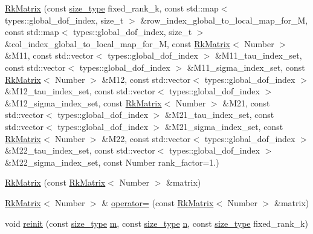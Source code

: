 \begin{DoxyCompactItemize}
\item 
\hyperlink{classRkMatrix_a00a2465dfb9445dca842f19fc757d008}{Rk\+Matrix} (const \hyperlink{classRkMatrix_add060bfc3a4cc77f858c3d6dd58cadd5}{size\+\_\+type} fixed\+\_\+rank\+\_\+k, const std\+::map$<$ types\+::global\+\_\+dof\+\_\+index, size\+\_\+t $>$ \&row\+\_\+index\+\_\+global\+\_\+to\+\_\+local\+\_\+map\+\_\+for\+\_\+M, const std\+::map$<$ types\+::global\+\_\+dof\+\_\+index, size\+\_\+t $>$ \&col\+\_\+index\+\_\+global\+\_\+to\+\_\+local\+\_\+map\+\_\+for\+\_\+M, const \hyperlink{classRkMatrix}{Rk\+Matrix}$<$ Number $>$ \&M11, const std\+::vector$<$ types\+::global\+\_\+dof\+\_\+index $>$ \&M11\+\_\+tau\+\_\+index\+\_\+set, const std\+::vector$<$ types\+::global\+\_\+dof\+\_\+index $>$ \&M11\+\_\+sigma\+\_\+index\+\_\+set, const \hyperlink{classRkMatrix}{Rk\+Matrix}$<$ Number $>$ \&M12, const std\+::vector$<$ types\+::global\+\_\+dof\+\_\+index $>$ \&M12\+\_\+tau\+\_\+index\+\_\+set, const std\+::vector$<$ types\+::global\+\_\+dof\+\_\+index $>$ \&M12\+\_\+sigma\+\_\+index\+\_\+set, const \hyperlink{classRkMatrix}{Rk\+Matrix}$<$ Number $>$ \&M21, const std\+::vector$<$ types\+::global\+\_\+dof\+\_\+index $>$ \&M21\+\_\+tau\+\_\+index\+\_\+set, const std\+::vector$<$ types\+::global\+\_\+dof\+\_\+index $>$ \&M21\+\_\+sigma\+\_\+index\+\_\+set, const \hyperlink{classRkMatrix}{Rk\+Matrix}$<$ Number $>$ \&M22, const std\+::vector$<$ types\+::global\+\_\+dof\+\_\+index $>$ \&M22\+\_\+tau\+\_\+index\+\_\+set, const std\+::vector$<$ types\+::global\+\_\+dof\+\_\+index $>$ \&M22\+\_\+sigma\+\_\+index\+\_\+set, const Number rank\+\_\+factor=1.)
\item 
\hyperlink{classRkMatrix_a5f886128ba604cc85f99e3c9c9a07e7c}{Rk\+Matrix} (const \hyperlink{classRkMatrix}{Rk\+Matrix}$<$ Number $>$ \&matrix)
\item 
\hyperlink{classRkMatrix}{Rk\+Matrix}$<$ Number $>$ \& \hyperlink{classRkMatrix_a8894542d0a6cda34a78cccf34eb3f990}{operator=} (const \hyperlink{classRkMatrix}{Rk\+Matrix}$<$ Number $>$ \&matrix)
\item 
void \hyperlink{classRkMatrix_a5457372194e8009bffc7b88f11b95d03}{reinit} (const \hyperlink{classRkMatrix_add060bfc3a4cc77f858c3d6dd58cadd5}{size\+\_\+type} \hyperlink{classRkMatrix_a8ca8898bcfedeee135437833f83b144c}{m}, const \hyperlink{classRkMatrix_add060bfc3a4cc77f858c3d6dd58cadd5}{size\+\_\+type} \hyperlink{classRkMatrix_a06d3b6636bb423c391c66e4ccc722687}{n}, const \hyperlink{classRkMatrix_add060bfc3a4cc77f858c3d6dd58cadd5}{size\+\_\+type} fixed\+\_\+rank\+\_\+k)
\item 

\end{DoxyCompactItemize}
